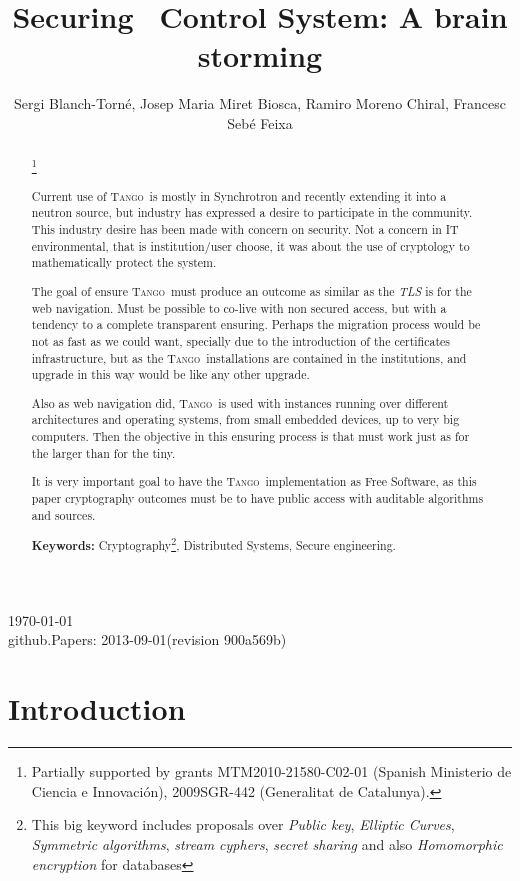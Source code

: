\documentclass[10pt,a4paper,twoside]{llncs}
\title{Securing \tango\, Control System: A brain storming}
\author{Sergi Blanch-Torn\'e\inst{1}, Josep Maria Miret Biosca\inst{2}, Ramiro Moreno Chiral\inst{2}, Francesc Seb\'e Feixa\inst{2}}
\institute{
 Escola Polit\`ecnica Superior, Universitat de Lleida. Spain.\\
 \email{\tt sblanch@alumnes.udl.es}
 \and 
 Departament de Matem\`atica. Universitat de Lleida. Spain.\\
 \email{\tt {miret,ramiro,fsebe}@matematica.udl.es}
 }
\newcommand{\version}{github.Papers: 2013-09-01\;(revision 900a569b) } %
\newcommand{\tango}{\textsc{Tango}}
\begin{document}
\maketitle
\begin{center}
 \today\\
 \version
\end{center}


\begin{abstract}\footnote{Partially supported by grants MTM2010-21580-C02-01 (Spanish Ministerio de Ciencia e Innovaci\'on), 2009SGR-442 (Generalitat de Catalunya).}

Current use of \tango\, is mostly in Synchrotron and recently extending it into a neutron source, but industry has expressed a desire to participate in the community. This industry desire has been made with concern on security. Not a concern in IT environmental, that is institution/user choose, it was about the use of cryptology to mathematically protect the system.

The goal of ensure \tango\, must produce an outcome as similar as the \emph{TLS} is for the web navigation. Must be possible to co-live with non secured access, but with a tendency to a complete transparent ensuring. Perhaps the migration process would be not as fast as we could want, specially due to the introduction of the certificates infrastructure, but as the \tango\, installations are contained in the institutions, and upgrade in this way would be like any other upgrade.

Also as web navigation did, \tango\, is used with instances running over different architectures and operating systems, from small embedded devices, up to very big computers. Then the objective in this ensuring process is that must work just as for the larger than for the tiny.

It is very important goal to have the \tango\, implementation as Free Software, as this paper cryptography outcomes must be to have public access with auditable algorithms and sources.
   
{\bf Keywords:} Cryptography\footnote{This big keyword includes proposals over \emph{Public key}, \emph{Elliptic Curves}, \emph{Symmetric algorithms}, \emph{stream cyphers}, \emph{secret sharing} and also \emph{Homomorphic encryption} for databases}, Distributed Systems, Secure engineering.

\end{abstract}

%
\section{Introduction \label{sec:introduction}}
\end{document}
